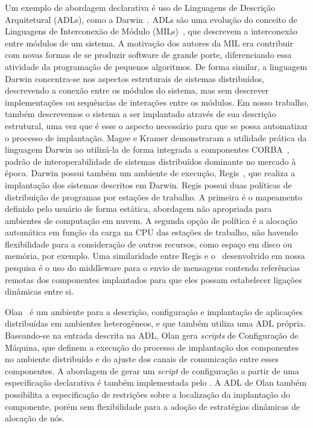 Um exemplo de abordagem declarativa é uso de Linguagens de Descrição Arquitetural (ADLs), como a Darwin~\cite{Magee1996Dynamic}. ADLs são uma evolução do conceito de Linguagens de Interconexão de Módulo (MILs)~\cite{DeRemer1976Programming}, que descrevem a interconexão entre módulos de um sistema. A motivação dos autores da MIL era contribuir com novas formas de se produzir software de grande porte, diferenciando essa atividade da programação de pequenos algoritmos. De forma similar, a linguagem Darwin concentra-se nos aspectos estruturais de sistemas distribuídos, descrevendo a conexão entre os módulos do sistema, mas sem descrever implementações ou sequências de interações entre os módulos. Em nosso trabalho, também descrevemos o sistema a ser implantado através de sua descrição estrutural, uma vez que é esse o aspecto necessário para que se possa automatizar o processo de implantação. Magee e Kramer demonstraram a utilidade prática da linguagem Darwin ao utilizá-la de forma integrada a componentes CORBA~\cite{Magee1997Corba}, padrão de interoperabilidade de sistemas distribuídos dominante no mercado à época. Darwin possui também um ambiente de execução, Regis~\cite{Magee1994Regis}, que realiza a implantação dos sistemas descritos em Darwin. Regis possui duas políticas de distribuição de programas por estações de trabalho. A primeira é o mapeamento definido pelo usuário de forma estática, abordagem não apropriada para ambientes de computação em nuvem. A segunda opção de política é a alocação automática em função da carga na CPU das estações de trabalho, não havendo flexibilidade para a consideração de outros recursos, como espaço em disco ou memória, por exemplo. Uma similaridade entre Regis e o \ee\ desenvolvido em nossa pesquisa é o uso do middleware para o envio de mensagens contendo referências remotas dos componentes implantados para que eles possam estabelecer ligações dinâmicas entre si.

Olan~\cite{Balter1998Olan} é um ambiente para a descrição, configuração e implantação de aplicações distribuídas em ambientes heterogêneos, e que também utiliza uma ADL própria. Baseando-se na entrada descrita na ADL, Olan gera \textit{scripts} de Configuração de Máquina, que definem a execução do processo de implantação dos componentes no ambiente distribuído e do ajuste dos canais de comunicação entre esses componentes. A abordagem de gerar um \textit{script} de configuração a partir de uma especificação declarativa é também implementada pelo \ee. A ADL de Olan também possibilita a especificação de restrições sobre a localização da implantação do componente, porém sem flexibilidade para a adoção de estratégias dinâmicas de alocação de nós.

